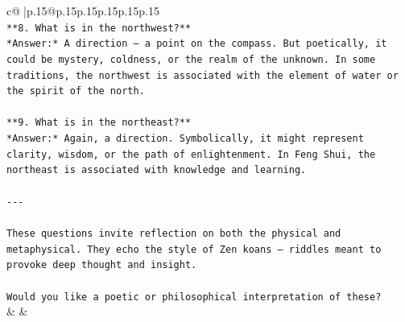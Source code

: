 \documentclass{article}
\begin{document}
{\begin{supertabular}{c@{$\;$}|p{.15\linewidth}@{}p{.15\linewidth}p{.15\linewidth}p{.15\linewidth}p{.15\linewidth}p{.15\linewidth}}
{{{\\ 
\texttt{**8. What is in the northwest?**  } \\
\texttt{*Answer:* A direction — a point on the compass. But poetically, it could be mystery, coldness, or the realm of the unknown. In some traditions, the northwest is associated with the element of water or the spirit of the north.} \\
\\ 
\texttt{**9. What is in the northeast?**  } \\
\texttt{*Answer:* Again, a direction. Symbolically, it might represent clarity, wisdom, or the path of enlightenment. In Feng Shui, the northeast is associated with knowledge and learning.} \\
\\ 
\texttt{{-}{-}{-}} \\
\\ 
\texttt{These questions invite reflection on both the physical and metaphysical. They echo the style of Zen koans — riddles meant to provoke deep thought and insight.} \\
\\ 
\texttt{Would you like a poetic or philosophical interpretation of these?} \\
            }
        }
    }
    & & \\ \\


\end{supertabular}}
\end{document}
